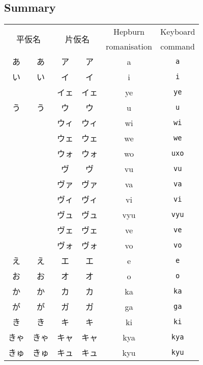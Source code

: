 \documentclass[../nihongo-gakushuu-kyouzai.tex]{subfiles}
\begin{document}
\subsection{Summary}
\begin{longtable}[c]{@{}cccccc@{}}
    \toprule
    \multicolumn{2}{c}{\multirow{2}{*}{平仮名}} & \multicolumn{2}{c}{\multirow{2}{*}{片仮名}} & Hepburn & Keyboard \\
    \multicolumn{2}{c}{} & \multicolumn{2}{c}{} & romanisation & command \\* \midrule
    あ & {\sffamily あ} & ア & {\sffamily ア} & a & \texttt{a} \\
    い & {\sffamily い} & イ & {\sffamily イ} & i & \texttt{i}\\
 & {\sffamily } & イェ & {\sffamily イェ} & ye & \texttt{ye} \\
    う & {\sffamily う} & ウ & {\sffamily ウ} & u & \texttt{u} \\
 & {\sffamily } & ウィ & {\sffamily ウィ} & wi & \texttt{wi} \\
 & {\sffamily } & ウェ & {\sffamily ウェ} & we & \texttt{we} \\
 & {\sffamily } & ウォ & {\sffamily ウォ} & wo & \color{red} \texttt{uxo} \\
 & {\sffamily } & ヴ & {\sffamily ヴ} & vu & \texttt{vu} \\
 & {\sffamily } & ヴァ & {\sffamily ヴァ} & va & \texttt{va} \\
 & {\sffamily } & ヴィ & {\sffamily ヴィ} & vi & \texttt{vi} \\
 & {\sffamily } & ヴュ & {\sffamily ヴュ} & vyu & \texttt{vyu} \\
 & {\sffamily } & ヴェ & {\sffamily ヴェ} & ve & \texttt{ve} \\
 & {\sffamily } & ヴォ & {\sffamily ヴォ} & vo & \texttt{vo} \\
    え & {\sffamily え} & エ & {\sffamily エ} & e & \texttt{e} \\
    お & {\sffamily お} & オ & {\sffamily オ} & o & \texttt{o} \\
    か & {\sffamily か} & カ & {\sffamily カ} & ka & \texttt{ka} \\
    が & {\sffamily が} & ガ & {\sffamily ガ} & ga & \texttt{ga} \\
    き & {\sffamily き} & キ & {\sffamily キ} & ki & \texttt{ki} \\
    きゃ & {\sffamily きゃ} & キャ & {\sffamily キャ} & kya & \texttt{kya} \\
    きゅ & {\sffamily きゅ} & キュ & {\sffamily キュ} & kyu & \texttt{kyu} \\

\end{longtable}
\end{document}
